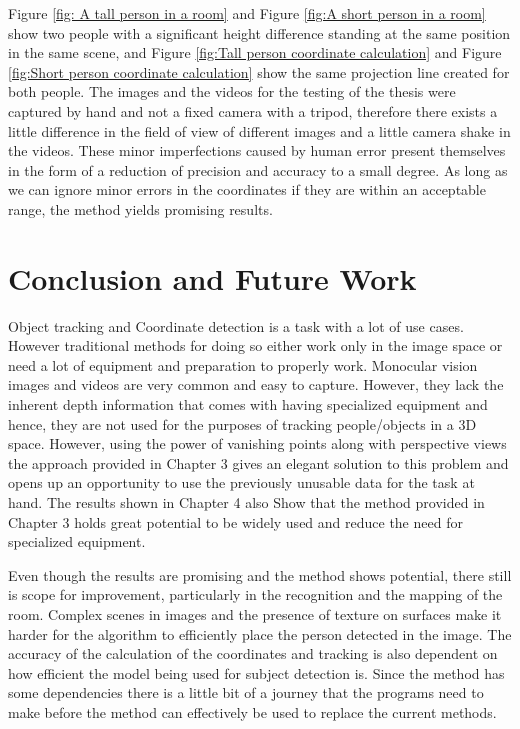 \documentclass[12pt]{report}
\begin{document}
Figure \ref{fig: A tall person in a room} and Figure \ref{fig:A short person in a room} show two people with a significant height difference standing at the same position in the same scene, and Figure \ref{fig:Tall person coordinate calculation} and Figure \ref{fig:Short person coordinate calculation} show the same projection line created for both people. The images and the videos for the testing of the thesis were captured by hand and not a fixed camera with a tripod, therefore there exists a little difference in the field of view of different images and a little camera shake in the videos. These minor imperfections caused by human error present themselves in the form of a reduction of precision and accuracy to a small degree. As long as we can ignore minor errors in the coordinates if they are within an acceptable range, the method yields promising results.\newline




\chapter{Conclusion and Future Work}

Object tracking and Coordinate detection is a task with a lot of use cases. However traditional methods for doing so either work only in the image space or need a lot of equipment and preparation to properly work. Monocular vision images and videos are very common and easy to capture. However, they lack the inherent depth information that comes with having specialized equipment and hence, they are not used for the purposes of tracking people/objects in a 3D space. However, using the power of vanishing points along with perspective views the approach provided in Chapter 3 gives an elegant solution to this problem and opens up an opportunity to use the previously unusable data for the task at hand. The results shown in Chapter 4 also Show that the method provided in Chapter 3 holds great potential to be widely used and reduce the need for specialized equipment.\newline

Even though the results are promising and the method shows potential, there still is scope for improvement, particularly in the recognition and the mapping of the room. Complex scenes in images and the presence of texture on surfaces make it harder for the algorithm to efficiently place the person detected in the image. The accuracy of the calculation of the coordinates and tracking is also dependent on how efficient the model being used for subject detection is. Since the method has some dependencies there is a little bit of a journey that the programs need to make before the method can effectively be used to replace the current methods.\newline

\newpage

 
\end{document}
